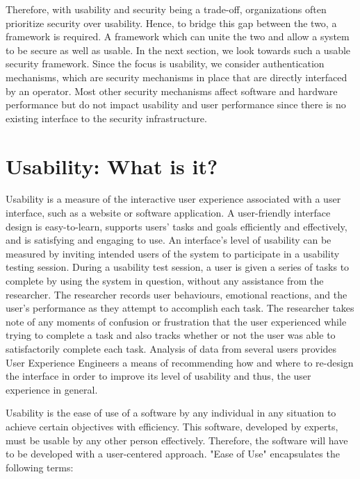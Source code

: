 \smallskip

Therefore, with usability and security being a trade-off, organizations often prioritize security over usability. Hence, to bridge this gap between the two, a framework is required. A framework which can unite the two and allow a system to be secure as well as usable. In the next section, we look towards such a usable security framework. Since the focus is usability, we consider authentication mechanisms, which are security mechanisms in place that are directly interfaced by an operator. Most other security mechanisms affect software and hardware performance but do not impact usability and user performance since there is no existing interface to the security infrastructure.

\section{Usability: What is it?}

Usability is a measure of the interactive user experience associated with a user interface, such as a website or software application. A user-friendly interface design is easy-to-learn, supports users' tasks and goals efficiently and effectively, and is satisfying and engaging to use.
\newline
An interface's level of usability can be measured by inviting intended users of the system to participate in a usability testing session. During a usability test session, a user is given a series of tasks to complete by using the system in question, without any assistance from the researcher. The researcher records user behaviours, emotional reactions, and the user's performance as they attempt to accomplish each task. The researcher takes note of any moments of confusion or frustration that the user experienced while trying to complete a task and also tracks whether or not the user was able to satisfactorily complete each task. Analysis of data from several users provides User Experience Engineers a means of recommending how and where to re-design the interface in order to improve its level of usability and thus, the user experience in general.

\smallskip

Usability is the ease of use of a software by any individual in any situation to achieve certain objectives with efficiency. This software, developed by experts, must be usable by any other person effectively. Therefore, the software will have to be developed with a user-centered approach. "Ease of Use" encapsulates the following terms:

